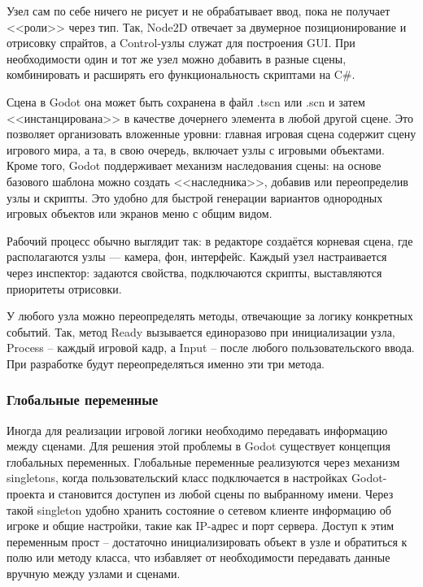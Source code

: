         Узел сам по себе ничего не рисует и не обрабатывает ввод, пока не получает <<роли>> через тип. Так, Node2D отвечает за двумерное позиционирование и отрисовку спрайтов, а Control-узлы 
        служат для построения GUI. При необходимости один и тот же узел можно добавить в разные сцены, комбинировать и расширять его функциональность 
        скриптами на C\#.

        Сцена в Godot она может быть сохранена в файл .tscn или .scn и затем <<инстанцирована>> в качестве дочернего элемента в любой 
        другой сцене. Это позволяет организовать вложенные уровни: главная игровая сцена содержит сцену игрового мира, а та, в свою очередь, включает узлы с игровыми объектами.
        Кроме того, Godot поддерживает механизм наследования сцены: на основе базового шаблона можно создать <<наследника>>, добавив или переопределив узлы и скрипты. Это удобно для 
        быстрой генерации вариантов однородных игровых объектов или экранов меню с общим видом.

        Рабочий процесс обычно выглядит так: в редакторе создаётся корневая сцена, где располагаются узлы — камера, фон, интерфейс. Каждый узел настраивается 
        через инспектор: задаются свойства, подключаются скрипты, выставляются приоритеты отрисовки.

        У любого узла можно переопределять методы, отвечающие за логику конкретных событий. Так, метод Ready вызывается единоразово при инициализации узла, Process -- каждый игровой кадр, а Input -- 
        после любого пользовательского ввода. При разработке будут переопределяться именно эти три метода.

        \subsubsection{Глобальные переменные}

        Иногда для реализации игровой логики необходимо передавать информацию между сценами. Для решения этой проблемы в Godot существует концепция глобальных переменных. 
        Глобальные переменные реализуются через механизм singletons, когда пользовательский класс подключается в настройках Godot-проекта и 
        становится доступен из любой сцены по выбранному имени. Через такой singleton удобно хранить состояние о сетевом клиенте информацию об игроке и общие настройки, такие как IP-адрес и порт
        сервера. Доступ к этим переменным прост -- достаточно инициализировать объект в узле и обратиться к полю или методу класса, что избавляет от необходимости передавать данные вручную между 
        узлами и сценами.


